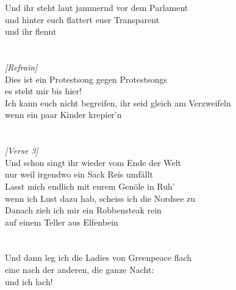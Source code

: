 {{Und ihr steht laut jammernd vor dem Parlament\\
und hinter euch flattert euer Transparent\\
und ihr flennt}\\
\\\noindent\vbox{~\\
\emph{[Refrain]}\\
Dies ist ein Protestsong gegen Protestsongs\\
es steht mir bis hier!\\
Ich kann euch nicht begreifen, ihr seid gleich am Verzweifeln\\
wenn ein paar Kinder krepier'n}\\
\\\noindent\vbox{~\\
\emph{[Verse 3]}\\
Und schon singt ihr wieder vom Ende der Welt\\
nur weil irgendwo ein Sack Reis umf{\"a}llt\\
Lasst mich endlich mit eurem Gen{\"o}le in Ruh'\\
wenn ich Lust dazu hab, scheiss ich die Nordsee zu\\
Danach zieh ich mir ein Robbensteak rein\\
auf einem Teller aus Elfenbein}\\
\\\noindent\vbox{~\\
Und dann leg ich die Ladies von Greenpeace flach\\
eine nach der anderen, die ganze Nacht:\\
und ich lach!}
}


